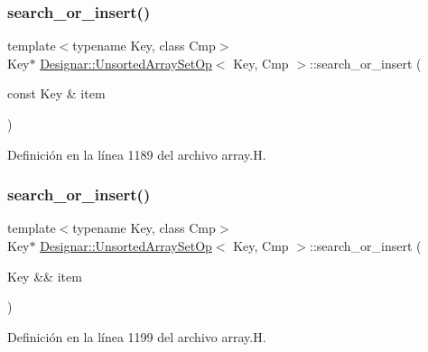 \subsubsection{\texorpdfstring{search\+\_\+or\+\_\+insert()}{search\_or\_insert()}\hspace{0.1cm}{\footnotesize\ttfamily [1/2]}}
{\footnotesize\ttfamily template$<$typename Key, class Cmp$>$ \\
Key$\ast$ \hyperlink{class_designar_1_1_unsorted_array_set_op}{Designar\+::\+Unsorted\+Array\+Set\+Op}$<$ Key, Cmp $>$\+::search\+\_\+or\+\_\+insert (\begin{DoxyParamCaption}\item[{const Key \&}]{item }\end{DoxyParamCaption})\hspace{0.3cm}{\ttfamily [inline]}}



Definición en la línea 1189 del archivo array.\+H.

\mbox{\label{class_designar_1_1_unsorted_array_set_op_afbef93edb33f4767a16f27affaefcee3}} 
\subsubsection{\texorpdfstring{search\+\_\+or\+\_\+insert()}{search\_or\_insert()}\hspace{0.1cm}{\footnotesize\ttfamily [2/2]}}
{\footnotesize\ttfamily template$<$typename Key, class Cmp$>$ \\
Key$\ast$ \hyperlink{class_designar_1_1_unsorted_array_set_op}{Designar\+::\+Unsorted\+Array\+Set\+Op}$<$ Key, Cmp $>$\+::search\+\_\+or\+\_\+insert (\begin{DoxyParamCaption}\item[{Key \&\&}]{item }\end{DoxyParamCaption})\hspace{0.3cm}{\ttfamily [inline]}}



Definición en la línea 1199 del archivo array.\+H.

\mbox{\label{class_designar_1_1_unsorted_array_set_op_aa73bc195688fed065a7cdd6b3f06a02e}} 
